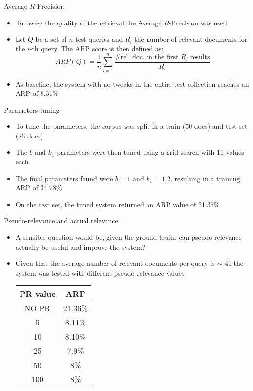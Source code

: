 \documentclass[]{beamer}
\begin{document}
\begin{frame}{Average $R$-Precision}
    \begin{itemize}
        \item To assess the quality of the retrieval the Average $R$-Precision was used
        \item Let $Q$ be a set of $n$ test queries and $R_i$ the number of relevant documents for the $i$-th query.
            The ARP score is then defined as:
            \begin{equation*}
                ARP(Q) = \frac{1}{n}\sum_{i=1}^{n} \frac{\text{\# rel. doc. in the first } R_i \text{ results}}{R_i}
            \end{equation*}
        \item As baseline, the system with no tweaks in the entire test collection reaches an ARP of 9.31\% 
    \end{itemize}
\end{frame}

\begin{frame}{Parameters tuning}
    \begin{itemize}
        \item To tune the parameters, the corpus was split in a train (50 docs) and test set (26 docs)
        \item The $b$ and $k_1$ parameters were then tuned using a grid search with 11 values each
        \item The final parameters found were $b=1$ and $k_1 = 1.2$, resulting in a training ARP of 34.78\%
        \item On the test set, the tuned system returned an ARP value of 21.36\%
    \end{itemize}
\end{frame}

\begin{frame}{Pseudo-relevance and actual relevance}
    \begin{itemize}
        \item A sensible question would be, given the ground truth, can pseudo-relevance actually be useful and improve the system?
        \item Given that the average number of relevant documents per query is $\sim$ 41 the system was tested with different pseudo-relevance values
        \vfill
        
        \begin{center}
            \begin{tabular}{c|c}
                PR value & ARP \\
                \hline 
                NO PR & 21.36\% \\
                5 & 8.11\% \\ 
                10 & 8.10\% \\
                25 & 7.9\% \\
                50 & 8\% \\ 
                100 & 8\% \\
            \end{tabular}
        \end{center}
    \end{itemize}
\end{frame}
\end{document}

